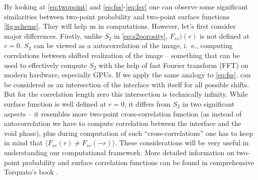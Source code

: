 \documentclass[reprint,amsmath,amssymb,aps,pre]{revtex4-1}
\begin{document}
By looking at \cref{eq:twopoint} and \cref{eq:fss}-\cref{eq:fsv} one can observe
some significant similarities between two-point probability and two-point
surface functions \cref{fig:scheme}. They will help us in computations. However,
let’s first consider major differences. Firstly, unlike $S_2$ in
\cref{eq:s2porosity}, $F_{ss})(r)$ is not defined at $r=0$. $S_2$ can be viewed
as a autocorrelation of the image, i.~e., computing correlations between shifted
realization of the image -- something that can be used to effectively compute
$S_2$ with the help of fast Fourier transform (FFT) on modern hardware,
especially GPUs. If we apply the same analogy to \cref{eq:fss}, can be
considered as an intersection of the interface with itself for all possible
shifts. But for the correlation length zero this intersection is technically
infinity. While surface function is well defined at $r=0$, it differs from $S_2$
in two significant aspects -- it resembles more two-point cross-correlation
function (as instead of autocorrelation we have to compute correlation between
the interface and the void phase), plus during computation of such
``cross-correlations'' one has to keep in mind that
$\langle F_{sv}(r) \ne F_{sv}(-r) \rangle$. These considerations will be very
useful in understanding our computational framework. More detailed information
on two-point probability and surface correlation functions can be found in
comprehensive Torquato’s book \cite{Torq_book}.

\end{document}
